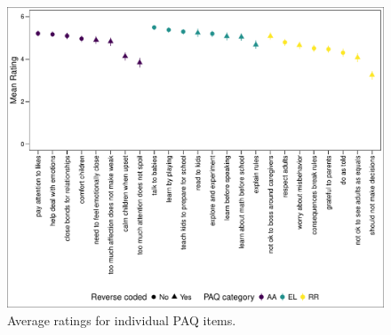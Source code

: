 \documentclass[floatsintext,man]{apa6}
\theoremstyle{definition}
\theoremstyle{definition}
\theoremstyle{definition}
\theoremstyle{remark}
\begin{document}
\begin{figure}
\centering
\includegraphics{PAQ_paper_files/figure-latex/sentratings-1.pdf}
\caption{\label{fig:sentratings}Average ratings for individual PAQ items.}
\end{figure}
\end{document}

